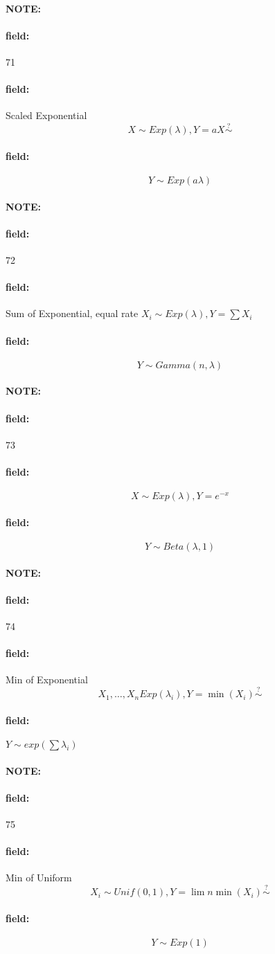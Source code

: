 \documentclass[12pt]{article}
\newenvironment{note}{\paragraph{NOTE:}}{}
\newenvironment{field}{\paragraph{field:}}{}
\begin{document}
\begin{note} \begin{field} \tiny 71 \end{field}
  \begin{field}
    Scaled Exponential
    $$ X \sim Exp(\lambda), Y = aX \overset{?}{\sim}$$
  \end{field}
  \begin{field}
    $$ Y \sim Exp(a\lambda)$$
  \end{field}
\end{note}

\begin{note} \begin{field} \tiny 72 \end{field}
  \begin{field}
    Sum of Exponential, equal rate
    $X_i \sim Exp(\lambda), Y = \sum X_i$
  \end{field}
  \begin{field}
    $$Y \sim Gamma(n,\lambda)$$
  \end{field}
\end{note}

\begin{note} \begin{field} \tiny 73 \end{field}
  \begin{field}
    $$ X \sim Exp(\lambda), Y  = e^{-x}$$
  \end{field}
  \begin{field}
    $$Y \sim Beta(\lambda,1)$$
  \end{field}
\end{note}

\begin{note} \begin{field} \tiny 74 \end{field}
  \begin{field}
    Min of Exponential
    $$X_1, \ldots , X_n Exp(\lambda_i), Y = \min(X_i) \overset{?}{\sim}$$
  \end{field}
  \begin{field}
    $Y \sim exp(\sum \lambda_i)$
  \end{field}
\end{note}

\begin{note} \begin{field} \tiny 75 \end{field}
  \begin{field}
    Min of Uniform
    $$ X_i \sim Unif(0,1), Y = \lim n \min(X_i) \overset{?}{\sim}$$
  \end{field}
  \begin{field}
    $$Y \sim Exp(1)$$
  \end{field}
\end{note}
\end{document}
